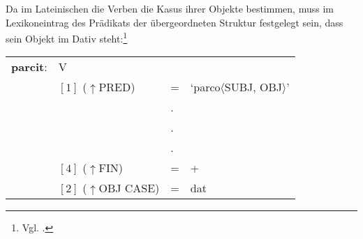 \documentclass[12pt,a4paper]{article}
\begin{document}
Da im Lateinischen die Verben die Kasus ihrer Objekte bestimmen, muss im Lexikoneintrag des Prädikats der übergeordneten Struktur festgelegt sein, dass sein Objekt im Dativ steht:\footnote{Vgl. \cite[48]{Skript}.} \\
\begin{singlespace}
\begin{tabular}{ l  l  l  l  } 
\textbf{parcit}: & V \\
$\qquad$ & $[1]$ \:  ($\uparrow$PRED) & = & `parco$\langle$SUBJ, OBJ$\rangle$' \\
$\qquad$ & $\qquad$ & . \\
$\qquad$ & $\qquad$ & . \\
$\qquad$ & $\qquad$ & . \\
$\qquad$ & $[4]$ \:  ($\uparrow$FIN) & = & + \\
$\qquad$ & $[2]$ \:  ($\uparrow$OBJ CASE) & = & dat \\
\end{tabular}
\newline
\end{singlespace}

\end{document}

